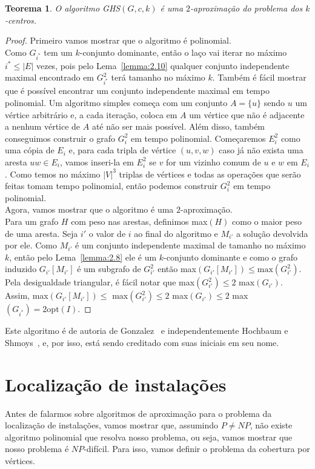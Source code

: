 \documentclass[12pt]{article}
\newcommand{\opt}{\ensuremath{\mathrm{opt}}}
\newtheorem{theorem}{Teorema}[section]
\newcommand{\NP}{\mathit{NP}}
\begin{document}
\begin{theorem}
    O algoritmo {\sc GHS}$(G,c,k)$ é uma $2$-aproximação do problema dos $k$-centros.
\end{theorem}
\begin{proof}
    Primeiro vamos mostrar que o algoritmo é polinomial. \\
    Como $G_{i^*}$ tem um $k$-conjunto dominante, então o laço vai iterar no máximo $i^* \leq |E|$ vezes, pois pelo Lema~\ref{lemma:2.10} qualquer conjunto independente maximal encontrado em $G_{i^*}^2$ terá tamanho no máximo $k$.
    Também é fácil mostrar que é possível encontrar um conjunto independente maximal em tempo polinomial. Um algoritmo simples começa com um conjunto $A = \{u\}$ sendo $u$ um vértice arbitrário e, a cada iteração, coloca em $A$ um vértice que não é adjacente a nenhum vértice de $A$ até não ser mais possível.
    Além disso, também conseguimos construir o grafo $G_i^2$ em tempo polinomial. Começaremos $E_i^2$ como uma cópia de $E_i$ e, para cada tripla de vértice $(u,v,w)$ caso já não exista uma aresta $uw \in E_i$, vamos inseri-la em $E_i^2$ se $v$ for um vizinho comum de $u$ e $w$ em $E_i$. Como temos no máximo $|V|^3$ triplas de vértices e todas as operações que serão feitas tomam tempo polinomial, então podemos construir $G_i^2$ em tempo polinomial. \\
    Agora, vamos mostrar que o algoritmo é uma $2$-aproximação. \\
    Para um grafo $H$ com peso nas arestas, definimos max$(H)$ como o maior peso de uma aresta. Seja $i'$ o valor de $i$ ao final do algoritmo e $M_{i'}$ a solução devolvida por ele. Como $M_{i'}$ é um conjunto independente maximal de tamanho no máximo $k$, então pelo Lema~\ref{lemma:2.8} ele é um $k$-conjunto dominante e como o grafo induzido $G_{i'}[M_{i'}]$ é um subgrafo de $G_{i'}^2$ então max$(G_{i'}[M_{i'}]) \leq \text{max}(G_{i'}^2) $. Pela desigualdade triangular, é fácil notar que max$(G_{i'}^2) \leq 2$  max$(G_{i'})$. \\Assim, max$(G_{i'}[M_{i'}]) \leq $ max$(G_{i'}^2) \leq 2$ max$(G_{i'}) \leq 2$ max$(G_{i^*})= 2 \opt(I)$. 
\end{proof}

Este algoritmo é de autoria de Gonzalez~\cite{GONZALEZ1985293} e independentemente Hochbaum e Shmoys~\cite{HSBottle}, e, por isso, está sendo creditado com suas iniciais em seu nome. 
\newpage
\section{Localização de instalações}
Antes de falarmos sobre algoritmos de aproximação para o problema da localização de instalações, vamos mostrar que, assumindo $P\neq\NP$, não existe algoritmo polinomial que resolva nosso problema, ou seja, vamos mostrar que nosso problema é $\NP$-difícil. Para isso, vamos definir o problema da cobertura por vértices.
\end{document}
